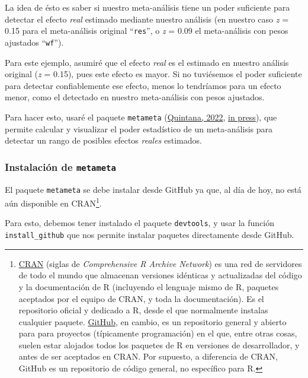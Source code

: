 \documentclass[
  bookmarksnumbered]{article}
\begin{document}
La idea de ésto es saber si nuestro meta-análisis tiene un poder suficiente para detectar el efecto \emph{real} estimado mediante nuestro análisis (en nuestro caso \emph{z} = 0.15 para el meta-análisis original ``\texttt{res}'', o \emph{z} = 0.09 el meta-análisis con pesos ajustados ``\texttt{wf}'').

Para este ejemplo, asumiré que el efecto \emph{real} es el estimado en nuestro análisis original (\emph{z} = 0.15), pues este efecto es mayor. Si no tuviésemos el poder suficiente para detectar confiablemente ese efecto, menos lo tendríamos para un efecto menor, como el detectado en nuestro meta-análisis con pesos ajustados.

Para hacer esto, usaré el paquete \texttt{metameta} (\protect\hyperlink{ref-quintanaMetameta2022}{Quintana, 2022}, \protect\hyperlink{ref-quintanaGuideMetaPower}{in press}), que permite calcular y visualizar el poder estadístico de un meta-análisis para detectar un rango de posibles efectos \emph{reales} estimados.

\hypertarget{instalaciuxf3n-de-metameta}{%
\subsubsection{\texorpdfstring{Instalación de \texttt{metameta}}{Instalación de metameta}}\label{instalaciuxf3n-de-metameta}}

El paquete \texttt{metameta} se debe instalar desde GitHub ya que, al día de hoy, no está aún disponible en CRAN\footnote{\href{https://cran.r-project.org/}{CRAN} (siglas de \emph{Comprehensive R Archive Network}) es una red de servidores de todo el mundo que almacenan versiones idénticas y actualizadas del código y la documentación de R (incluyendo el lenguaje mismo de R, paquetes aceptados por el equipo de CRAN, y toda la documentación). Es el repositorio oficial y dedicado a R, desde el que normalmente instalas cualquier paquete. \href{https://github.com/}{GitHub}, en cambio, es un repositorio general y abierto para para proyectos (típicamente programación) en el que, entre otras cosas, suelen estar alojados todos los paquetes de R en versiones de desarrollador, y antes de ser aceptados en CRAN. Por supuesto, a diferencia de CRAN, GitHub es un repositorio de código general, no específico para R.}.

Para esto, debemos tener instalado el paquete \texttt{devtools}, y usar la función \texttt{install\_github} que nos permite instalar paquetes directamente desde GitHub.
\end{document}
